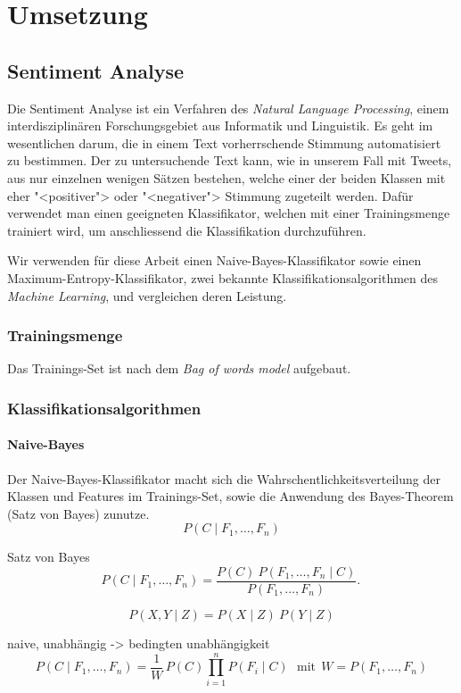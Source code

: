 \documentclass[12pt, oneside]{report}   	%
\begin{document}
\chapter{Umsetzung}

\section{Sentiment Analyse}
Die Sentiment Analyse ist ein Verfahren des \emph{Natural Language Processing}, einem interdisziplinären Forschungsgebiet aus Informatik und Linguistik.
Es geht im wesentlichen darum, die in einem Text vorherrschende Stimmung automatisiert zu bestimmen. 
Der zu untersuchende Text kann, wie in unserem Fall mit Tweets, aus nur einzelnen wenigen Sätzen bestehen, welche einer der beiden Klassen mit eher "<positiver"> oder "<negativer"> Stimmung zugeteilt werden.
Dafür verwendet man einen geeigneten Klassifikator, welchen  mit einer Trainingsmenge trainiert wird, um anschliessend die Klassifikation durchzuführen. 

Wir verwenden für diese Arbeit einen Naive-Bayes-Klassifikator sowie einen Maximum-Entropy-Klassifikator, zwei bekannte Klassifikationsalgorithmen des \emph{Machine Learning}, und vergleichen deren Leistung.


\subsection{Trainingsmenge}
Das Trainings-Set ist nach dem \emph{Bag of words model} aufgebaut.

\subsection{Klassifikationsalgorithmen}
\subsubsection{Naive-Bayes}

Der Naive-Bayes-Klassifikator macht sich die Wahrschentlichkeitsverteilung der Klassen und Features im Trainings-Set, sowie die Anwendung des Bayes-Theorem (Satz von Bayes) zunutze.
$$ P(C \mid F_1,\dots,F_n)$$

Satz von Bayes
$$
P(C \mid F_1,\dots,F_n) = \frac{P(C) \ P(F_1,\dots,F_n\mid C )}{P(F_1,\dots,F_n)}. \,
$$

$$ P(X,Y \mid Z) = P(X \mid Z) \ P(Y \mid Z) $$

naive, unabhängig -> bedingten unabhängigkeit
$$
P(C \mid F_1,\dots,F_n) = \frac{1}{W} \, P(C) \prod_{i=1}^n P(F_i\mid C)\ \ \ \mathrm{mit} \ \ W = P(F_1,\dots,F_n)
$$
\end{document}
